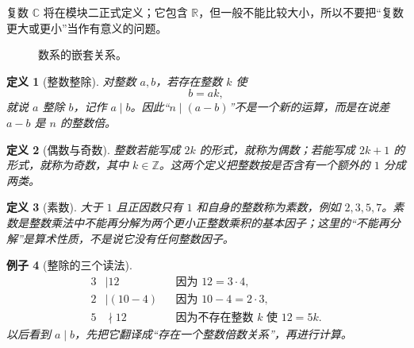 \documentclass[UTF8,fontset=none,a4paper,11pt]{ctexart}
\theoremstyle{foundation-definition}
\newtheorem{definition}{定义}[section]
\theoremstyle{foundation-theorem}
\theoremstyle{foundation-proposition}
\theoremstyle{foundation-example}
\newtheorem{example}[definition]{例子}
\theoremstyle{foundation-remark}
\theoremstyle{foundation-theorem}
\begin{document}
复数 \(\mathbb C\) 将在模块二正式定义；它包含 \(\mathbb R\)，但一般不能比较大小，所以不要把“复数更大或更小”当作有意义的问题。

\begin{figure}[htbp]
\centering
{}
\caption{数系的嵌套关系。}
\label{fig:number-systems}
\end{figure}

\begin{definition}[整数整除]\label{def:integer-divisibility}
对整数 \(a,b\)，若存在整数 \(k\) 使
\[
b=ak,
\]
就说 \(a\) 整除 \(b\)，记作 \(a\mid b\)。因此“\(n\mid(a-b)\)”不是一个新的运算，而是在说差 \(a-b\) 是 \(n\) 的整数倍。
\end{definition}

\begin{definition}[偶数与奇数]\label{def:parity}
整数若能写成 \(2k\) 的形式，就称为偶数；若能写成 \(2k+1\) 的形式，就称为奇数，其中 \(k\in\mathbb Z\)。这两个定义把整数按是否含有一个额外的 \(1\) 分成两类。
\end{definition}

\begin{definition}[素数]\label{def:prime-number}
大于 \(1\) 且正因数只有 \(1\) 和自身的整数称为素数，例如 \(2,3,5,7\)。素数是整数乘法中不能再分解为两个更小正整数乘积的基本因子；这里的“不能再分解”是算术性质，不是说它没有任何整数因子。
\end{definition}

\begin{example}[整除的三个读法]
\[
\begin{aligned}
3&\mid12 &&\text{因为 }12=3\cdot4,\\
2&\mid(10-4) &&\text{因为 }10-4=2\cdot3,\\
5&\nmid12 &&\text{因为不存在整数 }k\text{ 使 }12=5k.
\end{aligned}
\]
以后看到 \(a\mid b\)，先把它翻译成“存在一个整数倍数关系”，再进行计算。
\end{example}
\end{document}
